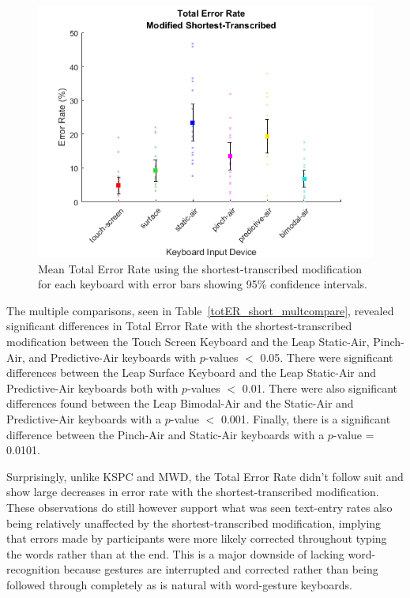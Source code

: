 \begin{figure}[h]
	\centering
	\includegraphics{fig_totER_short_mean}
	\caption[Mean Total Error Rate for Modified-Shortest]{Mean Total Error Rate using the shortest-transcribed modification for each keyboard with error bars showing 95\% confidence intervals.}
	\label{fig_totER_short_mean}
\end{figure}

The multiple comparisons, seen in Table~\ref{totER_short_multcompare}, revealed significant differences in Total Error Rate with the shortest-transcribed modification between the Touch Screen Keyboard and the Leap Static-Air, Pinch-Air, and Predictive-Air keyboards with $p$-values $<$ 0.05. There were significant differences between the Leap Surface Keyboard and the Leap Static-Air and Predictive-Air keyboards both with $p$-values $<$ 0.01. There were also significant differences found between the Leap Bimodal-Air and the Static-Air and Predictive-Air keyboards with a $p$-value $<$ 0.001. Finally, there is a significant difference between the Pinch-Air and Static-Air keyboards with a $p$-value = 0.0101.

Surprisingly, unlike KSPC and MWD, the Total Error Rate didn't follow suit and show large decreases in error rate with the shortest-transcribed modification. These observations do still however support what was seen text-entry rates also being relatively unaffected by the shortest-transcribed modification, implying that errors made by participants were more likely corrected throughout typing the words rather than at the end. This is a major downside of lacking word-recognition because gestures are interrupted and corrected rather than being followed through completely as is natural with word-gesture keyboards.

